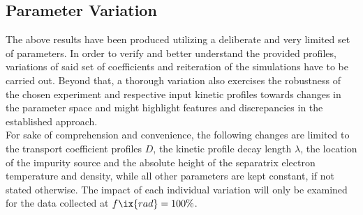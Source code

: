         \subsection{Parameter Variation}\label{subsec:parametervar}%
%
            The above results have been produced utilizing a deliberate and very limited set of parameters. In order to verify and better understand the provided profiles, variations of said set of coefficients and reiteration of the simulations have to be carried out. Beyond that, a thorough variation also exercises the robustness of the chosen experiment and respective input kinetic profiles towards changes in the parameter space and might highlight features and discrepancies in the established approach.\\%
            For sake of comprehension and convenience, the following changes are limited to the transport coefficient profiles $D$, the kinetic profile decay length $\lambda$, the location of the impurity source and the absolute height of the separatrix electron temperature and density, while all other parameters are kept constant, if not stated otherwise. The impact of each individual variation will only be examined for the data collected at $f\ix{rad}=100\%$.%
%
